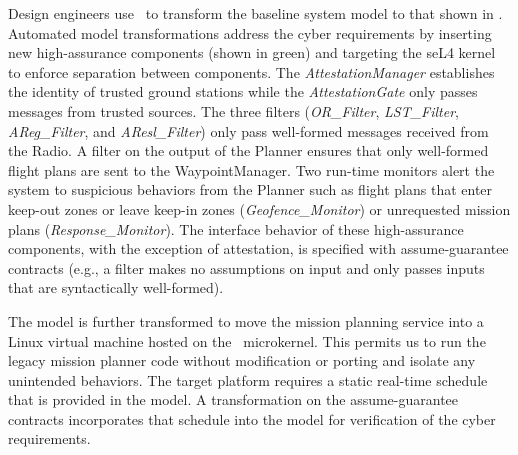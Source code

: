 Design engineers use \briefcase\ to transform the baseline system model to that shown in
.  Automated model transformations address the cyber requirements by inserting  
new high-assurance components (shown in green) and targeting the seL4 kernel to enforce separation between components.
The \emph{AttestationManager} establishes the identity of trusted ground stations while
the \emph{AttestationGate} only passes messages from trusted sources.  The three 
filters  (\emph{OR\_Filter}, \emph{LST\_Filter}, \emph{AReg\_Filter}, and \emph{AResl\_Filter}) 
only pass well-formed messages received from the Radio. A filter on the output of the Planner ensures 
that only well-formed flight plans are sent to the WaypointManager.  
Two run-time monitors alert the system to suspicious behaviors from the Planner such as flight plans that enter keep-out zones or leave
keep-in zones (\emph{Geofence\_Monitor}) or unrequested mission plans (\emph{Response\_Monitor}).
The interface behavior of these high-assurance components, with the exception of attestation, is
specified with assume-guarantee contracts (e.g., a filter makes no assumptions on input and only
passes inputs that are syntactically well-formed).

The model is further transformed to move the mission planning service into a 
Linux virtual machine hosted on the \selFour \ microkernel. This permits us to run the
legacy mission planner code without modification or porting and isolate any 
unintended behaviors.  
The target platform requires a static real-time schedule that is provided in the model.
A transformation on the assume-guarantee contracts incorporates that schedule into the model
for verification of the cyber requirements.

%
